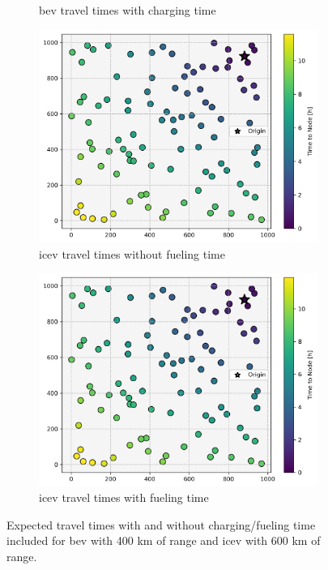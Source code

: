 \documentclass[12pt]{article}
\begin{document}
\begin{figure}[H]
\begin{subfigure}[t]{.5\linewidth}
		\captionsetup{width=.8\linewidth}
		\caption{\gls{bev} travel times with charging time}
	\end{subfigure}
	\begin{subfigure}[t]{.5\linewidth}
		\centering\includegraphics[width = \linewidth]{figs/effect_of_charging_icev_nc.png}
		\captionsetup{width=.8\linewidth}
		\caption{\gls{icev} travel times without fueling time}
	\end{subfigure}%
	\begin{subfigure}[t]{.5\linewidth}
		\centering\includegraphics[width = \linewidth]{figs/effect_of_charging_icev_c.png}
		\captionsetup{width=.8\linewidth}
		\caption{\gls{icev} travel times with fueling time}
	\end{subfigure}
	\caption{Expected travel times with and without charging/fueling time included for \gls{bev} with 400 km of range and \gls{icev} with 600 km of range.}
	\label{fig:effect_of_charging}
\end{figure}
\end{document}
